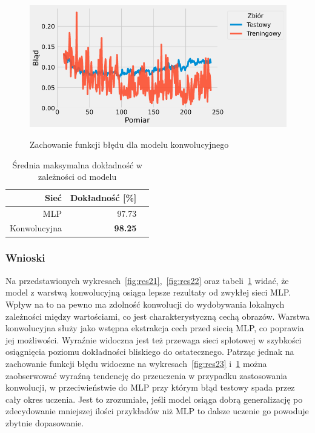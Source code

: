 \documentclass{article}
\begin{document}
\begin{figure}[H]
	\centering
	\caption{Zachowanie funkcji błędu dla modelu konwolucyjnego}
	\includegraphics[width=\textwidth]{con_err.png}
	\label{fig:res24}
\end{figure}

\begin{table}[H]
	\caption{Średnia maksymalna dokładność w zależności od modelu}
	\label{tabela-res-21}
	\centering
	\begin{tabular}{rrr}
		\toprule
		Sieć        & Dokładność [\%] \\
		\midrule
		MLP          & 97.73              \\
		Konwolucyjna & \textbf{98.25}     \\
		\bottomrule
	\end{tabular}
\end{table}

\subsubsection*{Wnioski}
Na przedstawionych wykresach~\ref{fig:res21},~\ref{fig:res22} oraz tabeli~\ref{tabela-res-21} widać, że model z warstwą konwolucyjną osiąga lepsze rezultaty od zwykłej sieci MLP. Wpływ na to na pewno ma zdolność konwolucji do wydobywania lokalnych zależności między wartościami, co jest charakterystyczną cechą obrazów. Warstwa konwolucyjna służy jako wstępna ekstrakcja cech przed siecią MLP, co poprawia jej możliwości. Wyraźnie widoczna jest też przewaga sieci splotowej w szybkości osiągnięcia poziomu dokładności bliskiego do ostatecznego. Patrząc jednak na zachowanie funkcji błędu widoczne na wykresach~\ref{fig:res23} i~\ref{fig:res24} można zaobserwować wyraźną tendencję do przeuczenia w przypadku zastosowania konwolucji, w przeciwieństwie do MLP przy którym błąd testowy spada przez cały okres uczenia. Jest to zrozumiałe, jeśli model osiąga dobrą generalizację po zdecydowanie mniejszej ilości przykładów niż MLP to dalsze uczenie go powoduje zbytnie dopasowanie.
\end{document}
